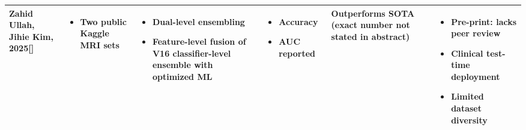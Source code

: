 \documentclass[12pt]{article}
\begin{document}
\begin{longtable}{|>{\RaggedRight}p{2.5cm}|>{\RaggedRight}p{2.8cm}|>{\RaggedRight}p{4cm}|>{\RaggedRight}p{2.8cm}|>{\RaggedRight}p{3.2cm}|>{\RaggedRight}p{3.5cm}|}
Zahid Ullah, Jihie Kim, 2025[] & 
\begin{itemize}[leftmargin=8pt, itemsep=1pt, parsep=0pt]
\item Two public Kaggle MRI sets
\end{itemize} & 
\begin{itemize}[leftmargin=8pt, itemsep=1pt, parsep=0pt]
\item Dual-level ensembling
\item Feature-level fusion of V16 classifier-level ensemble with optimized ML
\end{itemize} & 
\begin{itemize}[leftmargin=8pt, itemsep=1pt, parsep=0pt]
\item Accuracy
\item AUC reported
\end{itemize} & 
Outperforms SOTA (exact number not stated in abstract) & 
\begin{itemize}[leftmargin=8pt, itemsep=1pt, parsep=0pt]
\item Pre-print: lacks peer review
\item Clinical test-time deployment
\item Limited dataset diversity
\end{itemize} \\
\hline


\end{longtable}
\end{document}
